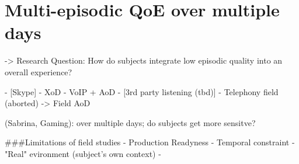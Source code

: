 \chapter{Multi-episodic QoE over multiple days}

  -> Research Question: How do subjects integrate low episodic quality into an overall experience?

  - [Skype]
  - XoD
  - VoIP + AoD
  - [3rd party listening (tbd)]
  - Telephony field (aborted)
  -> Field AoD

  (Sabrina, Gaming): over multiple days; do subjects get more sensitve?

  ###Limitations of field studies
  - Production Readyness
  - Temporal constraint
  - "Real" evironment (subject's own context)
  -